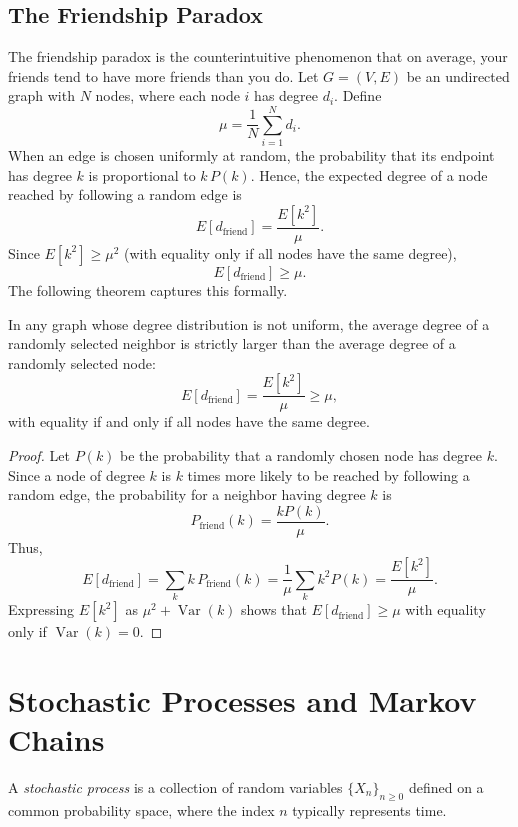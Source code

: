 \documentclass[11pt, headings=standardclasses, parskip=half, twoside]{scrartcl}
\newcommand{\Var}{\operatorname{Var}}
\begin{document}
\subsection{The Friendship Paradox}\label{subsec:friendship}
The friendship paradox is the counterintuitive phenomenon that on average, your friends tend to have more friends than you do. Let \(G=(V,E)\) be an undirected graph with \(N\) nodes, where each node \(i\) has degree \(d_i\). Define
\[
\mu=\frac{1}{N}\sum_{i=1}^N d_i.
\]
When an edge is chosen uniformly at random, the probability that its endpoint has degree \(k\) is proportional to \(k\,P(k)\). Hence, the expected degree of a node reached by following a random edge is
\[
E[d_{\mathrm{friend}}]=\frac{E[k^2]}{\mu}.
\]
Since \(E[k^2]\ge \mu^2\) (with equality only if all nodes have the same degree),
\[
E[d_{\mathrm{friend}}]\ge \mu.
\]
The following theorem captures this formally.

\begin{theorem}\label{thm:friendship}
In any graph whose degree distribution is not uniform, the average degree of a randomly selected neighbor is strictly larger than the average degree of a randomly selected node:
\[
E[d_{\mathrm{friend}}]=\frac{E[k^2]}{\mu}\ge \mu,
\]
with equality if and only if all nodes have the same degree.
\end{theorem}

\begin{proof}
Let \(P(k)\) be the probability that a randomly chosen node has degree \(k\). Since a node of degree \(k\) is \(k\) times more likely to be reached by following a random edge, the probability for a neighbor having degree \(k\) is
\[
P_{\mathrm{friend}}(k)=\frac{kP(k)}{\mu}.
\]
Thus,
\[
E[d_{\mathrm{friend}}]=\sum_{k} k\,P_{\mathrm{friend}}(k)=\frac{1}{\mu}\sum_{k} k^2 P(k)=\frac{E[k^2]}{\mu}.
\]
Expressing \(E[k^2]\) as \(\mu^2+\Var(k)\) shows that \(E[d_{\mathrm{friend}}]\ge \mu\) with equality only if \(\Var(k)=0\).
\end{proof}


















\section{Stochastic Processes and Markov Chains}\label{sec:markov}
\begin{definition}\label{def:stochastic}
A \emph{stochastic process} is a collection of random variables \(\{X_n\}_{n\ge0}\) defined on a common probability space, where the index \(n\) typically represents time.
\end{definition}
\end{document}

